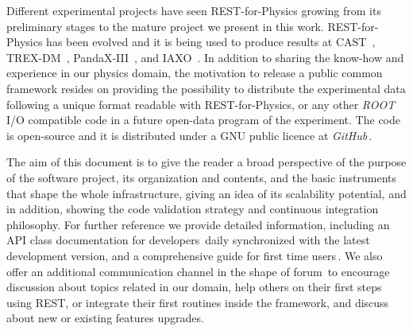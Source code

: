 Different experimental projects have seen REST-for-Physics growing from its preliminary stages to the mature project we present in this work. REST-for-Physics has been evolved and it is being used to produce results at CAST~\cite{Anastassopoulos:2017ftl}, TREX-DM~\cite{trexdm_bckmodel}, PandaX-III~\cite{pandaxiii_cdr,Lin:2018mpd,Galan:2019ake}, and IAXO~\cite{Armengaud:2019uso}. In addition to sharing the know-how and experience in our physics domain, the motivation to release a public common framework resides on providing the possibility to distribute the experimental data following a unique format readable with REST-for-Physics, or any other \emph{ROOT} I/O compatible code in a future open-data program of the experiment. The code is open-source and it is distributed under a GNU public licence at \emph{GitHub}\,\cite{REST_Git}.

The aim of this document is to give the reader a broad perspective of the purpose of the software project, its organization and contents, and the basic instruments that shape the whole infrastructure, giving an idea of its scalability potential, and in addition, showing the code validation strategy and continuous integration philosophy. For further reference we provide detailed information, including an API class documentation for developers\,\cite{REST_API} daily synchronized with the latest development version, and a comprehensive guide for first time users\,\cite{REST_user_guide}. We also offer an additional communication channel in the shape of forum\,\cite{REST_forum} to encourage discussion about topics related in our domain, help others on their first steps using REST, or integrate their first routines inside the framework, and discuss about new or existing features upgrades.







